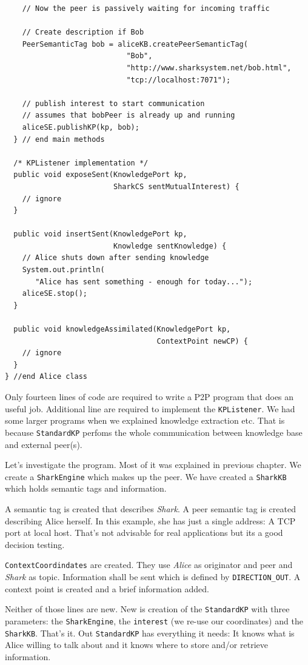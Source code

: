 \begin{verbatim}
    // Now the peer is passively waiting for incoming traffic

    // Create description if Bob
    PeerSemanticTag bob = aliceKB.createPeerSemanticTag(
                            "Bob", 
                            "http://www.sharksystem.net/bob.html", 
                            "tcp://localhost:7071");

    // publish interest to start communication
    // assumes that bobPeer is already up and running
    aliceSE.publishKP(kp, bob);
  } // end main methods

  /* KPListener implementation */
  public void exposeSent(KnowledgePort kp, 
                         SharkCS sentMutualInterest) {
    // ignore
  }

  public void insertSent(KnowledgePort kp, 
                         Knowledge sentKnowledge) {
    // Alice shuts down after sending knowledge
    System.out.println(
       "Alice has sent something - enough for today...");
    aliceSE.stop();
  }

  public void knowledgeAssimilated(KnowledgePort kp, 
                                   ContextPoint newCP) {
    // ignore
  }
} //end Alice class
\end{verbatim}

Only fourteen lines of code are required to write a P2P program that does an useful job. Additional line are required to implement the {\tt KPListener}. We had some larger programs when we explained knowledge extraction etc. That is because {\tt StandardKP} perfoms the whole communication between knowledge base and external peer(s). 

Let's investigate the program. Most of it was explained in previous chapter. We create a {\tt SharkEngine} which makes up the peer. We have created a {\tt SharkKB} which holds semantic tags and information.

A semantic tag is created that describes {\it Shark}. A peer semantic tag is created describing Alice herself. In this example, she has just a single address: A TCP port at local host. That's not advisable for real applications but its a good decision testing.

{\tt ContextCoordindates} are created. They use {\it Alice} as originator and peer and {\it Shark} as topic. Information shall be sent which is defined by 
{\tt DIRECTION\_OUT}. A context point is created and a brief information added.

Neither of those lines are new. New is creation of the {\tt StandardKP} with three parameters: the {\tt SharkEngine}, the {\tt interest} (we re-use our coordinates) and the {\tt SharkKB}. That's it. Out {\tt StandardKP} has everything it needs: It knows what is Alice willing to talk about and it knows where to store and/or retrieve information.

